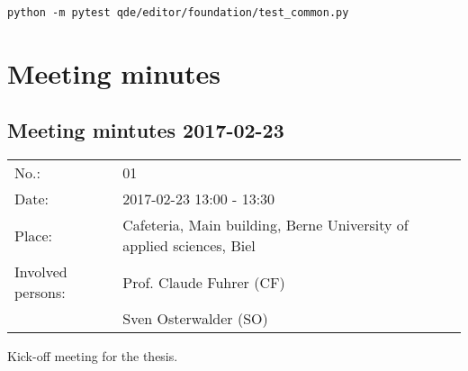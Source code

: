 \documentclass[10pt, openright, notitlepage]{scrreprt}
\begin{document}
\begin{verbatim}
python -m pytest qde/editor/foundation/test_common.py
\end{verbatim}


\section{Meeting minutes}
\label{sec:org27bdcac}

\subsection{Meeting mintutes 2017-02-23}
\label{sec:org2ba6021}

\begin{center}
\begin{tabular}{ll}
No.: & 01\\
Date: & 2017-02-23 13:00 - 13:30\\
Place: & Cafeteria, Main building, Berne University of applied sciences, Biel\\
Involved persons: & Prof. Claude Fuhrer (CF)\\
 & Sven Osterwalder (SO)\\
\end{tabular}
\end{center}

Kick-off meeting for the thesis.
\end{document}
